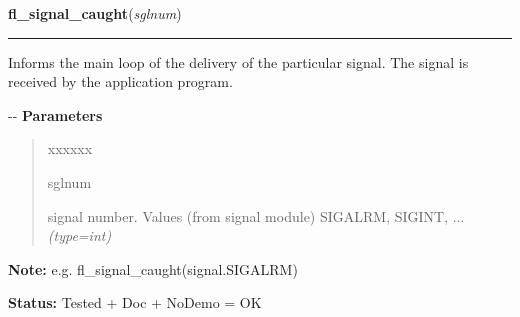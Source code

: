 \hspace{.8\funcindent}\begin{boxedminipage}{\funcwidth}

    \raggedright \textbf{fl\_signal\_caught}(\textit{sglnum})

    \vspace{-1.5ex}

    \rule{\textwidth}{0.5\fboxrule}
\setlength{\parskip}{2ex}

Informs the main loop of the delivery of the particular signal. The
signal is received by the application program.

-{}-
\setlength{\parskip}{1ex}
      \textbf{Parameters}
      \vspace{-1ex}

      \begin{quote}
        \begin{Ventry}{xxxxxx}

          \item[sglnum]


signal number. Values (from signal module) SIGALRM, SIGINT, ...
            {\it (type=int)}

        \end{Ventry}

      \end{quote}

\textbf{Note:} 
e.g. fl\_signal\_caught(signal.SIGALRM)


\textbf{Status:} 
Tested + Doc + NoDemo = OK


    \end{boxedminipage}

    \label{xformslib:flbasic:fl_app_signal_direct}

    \vspace{0.5ex}

